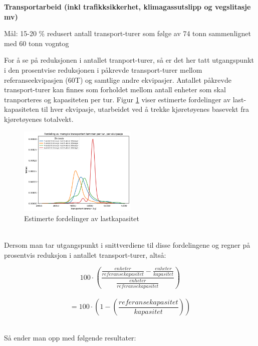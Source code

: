 {
\large
\textbf
{
Transportarbeid (inkl trafikksikkerhet, klimagassutslipp og vegslitasje mv)
}
}

\begin{formal}
Mål: 15-20 \% redusert antall transport-turer som følge av 74 tonn sammenlignet med 60 tonn vogntog
\end{formal}

For å se på reduksjonen i antallet tranport-turer, så er det her tatt utgangspunkt i den prosentvise
reduksjonen i påkrevde transport-turer mellom referanseekvipasjen (60T) og samtlige andre ekvipasjer.
Antallet påkrevde transport-turer kan finnes som forholdet mellom antall enheter som skal tranporteres og
kapasiteten per tur. 
Figur \ref{fig:timer_per_trip} viser estimerte fordelinger av last-kapasiteten til hver ekvipasje,
utarbeidet ved å trekke kjøretøyenes basevekt fra kjøretøyenes totalvekt.

\begin{figure}[H]
\centering
\includegraphics[width=0.5\textwidth]{images/timer_per_trip.png}
\caption{Estimerte fordelinger av lastkapasitet}
\label{fig:timer_per_trip}
\end{figure}

\phantom{}\\
Dersom man tar utgangspunkt i
snittverdiene til disse fordelingene og regner på prosentvis reduksjon i antallet transport-turer, altså:

\[
100 \cdot \left(\frac{ \frac{enheter}{referansekapasitet} - \frac{enheter}{kapasitet} }{\frac{enheter}{referansekapasitet}}\right)
\]
\\
\[
= 100 \cdot \left( 1 - \left(\frac{referansekapasitet}{kapasitet}\right) \right)
\]

\phantom{}\\
Så ender man opp med følgende resultater:

